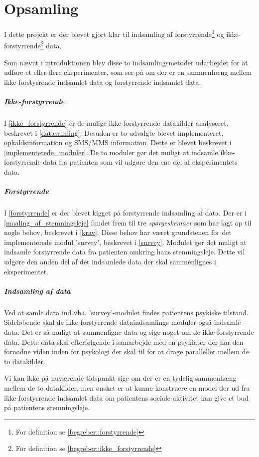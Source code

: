 \chapter{Opsamling}
I dette projekt er der blevet gjort klar til indsamling af  forstyrrende\footnote{For definition se \cref{begreber::forstyrrende}} og ikke-forstyrrende\footnote{For definition se \cref{begreber::ikke_forstyrrende}} data. 

Som nævnt i introduktionen blev disse to indsamlingsmetoder udarbejdet for at udføre et eller flere eksperimenter, som ser på om der er en sammenhæng mellem ikke-forstyrrende indsamlet data og forstyrrende indsamlet data.
 

\paragraph{Ikke-forstyrrende}
I \cref{ikke_forstyrrende} er de mulige ikke-forstyrrende datakilder analyseret, beskrevet i \cref{datasamling}.
Desuden er to udvalgte blevet implementeret, opkaldsinformation og SMS/MMS information.
Dette er blevet beskrevet i \cref{implementerede_moduler}.
De to moduler gør det muligt at indsamle ikke-forstyrrende data fra patienten som vil udgøre den ene del af eksperimentets data.

\paragraph{Forstyrrende}
I \cref{forstyrrende} er der blevet kigget på forstyrrende indsamling af data.
Der er i \cref{maaling_af_stemningsleje} fundet frem til tre \textit{spørgeskemaer} som har lagt op til nogle behov, beskrevet i \cref{krav}.
Disse behov har været grundstenen for det implementerede modul 'survey', beskrevet i \cref{survey}.
Modulet gør det muligt at indsamle forstyrrende data fra patienten omkring hans stemningsleje.
Dette vil udgøre den anden del af det indsamlede data der skal sammenlignes i eksperimentet.

\paragraph{Indsamling af data}
Ved at samle data ind vha. 'survey'-modulet findes patientens psykiske tilstand.
Sideløbende skal de ikke-forstyrrende dataindsamlings-moduler også indsamle data.
Det er så muligt at sammenligne data og sige noget om de ikke-forstyrrende data.
Dette data skal efterfølgende i samarbejde med en psykiater der har den fornødne viden inden for psykologi der skal til for at drage paralleller mellem de to datakilder.

Vi kan ikke på nuværende tidspunkt sige om der er en tydelig sammenhæng mellem de to datakilder, men ønsket er at kunne konstruere en model der ud fra ikke-forstyrrende indsamlet data om patientens sociale aktivitet kan give et bud på patientens stemningsleje.